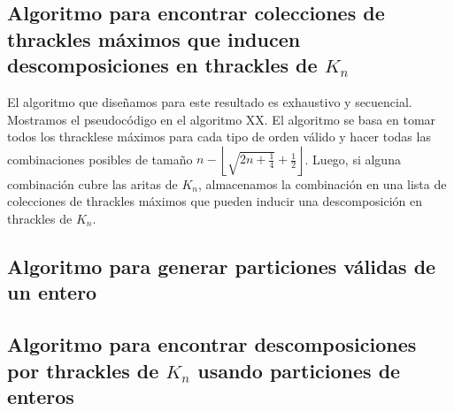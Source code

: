 \subsection{Algoritmo para encontrar colecciones de thrackles máximos que
inducen descomposiciones en thrackles de $K_n$}\label{secc:descomposicion_thrackles_maximos}
  El algoritmo que diseñamos para este resultado es exhaustivo y secuencial.
  Mostramos el pseudocódigo en el algoritmo XX. %
  El algoritmo se basa en tomar todos los thracklese máximos para cada tipo de
  orden válido y hacer todas las combinaciones posibles de tamaño $n -
  \left\lfloor\sqrt{2n+\frac{1}{4}} + \frac{1}{2}\right\rfloor$. Luego, si
  alguna combinación cubre las aritas de $K_n$, almacenamos la combinación en
  una lista de colecciones de thrackles máximos que pueden inducir una
  descomposición en thrackles de $K_n$.
\subsection{Algoritmo para generar particiones válidas de un entero}
\subsection{Algoritmo para encontrar descomposiciones por thrackles de $K_n$
usando particiones de enteros}\label{
secc:descomposiciones_particiones}

